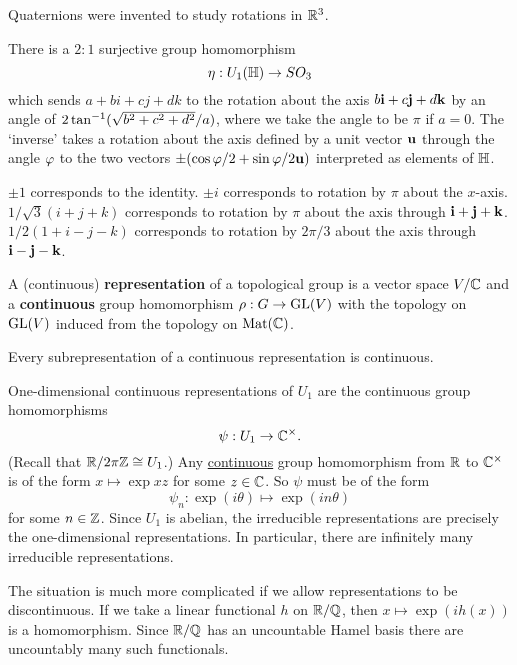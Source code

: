 Quaternions were invented to study rotations in $\mathbb{R}^3$.

\begin{thm}[Hamilton]
  There is a $2:1$ surjective group homomorphism
  \[ \eta: U_1(\mathbb{H}) \to SO_3 \]
  which sends $a+bi+cj+dk$ to the rotation about the axis $b\mathbf{i} + c\mathbf{j} + d\mathbf{k}$ by an angle of $2\tan^{-1}(\sqrt{b^2+c^2+d^2}/a)$, where we take the angle to be $\pi$ if $a=0$.
  The `inverse' takes a rotation about the axis defined by a unit vector $\mathbf{u}$ through the angle $\varphi$ to the two vectors $\pm( \cos\varphi/2 + \sin\varphi/2\mathbf{u})$ interpreted as elements of $\mathbb{H}$.
\end{thm}

\begin{exam}
  \io $\pm 1$ corresponds to the identity.
  \io $\pm i$ corresponds to rotation by $\pi$ about the $x$-axis.
  \io $1/\sqrt{3}(i+j+k)$ corresponds to rotation by $\pi$ about the axis through $\mathbf{i}+\mathbf{j}+\mathbf{k}$.
  \io $1/2(1+i-j-k)$ corresponds to rotation by $2\pi/3$ about the axis through $\mathbf{i}-\mathbf{j}-\mathbf{k}$.
\end{exam}

\begin{defn}
  A (continuous) \textbf{representation} of a topological group is a vector space $V/\mathbb{C}$ and a \textbf{continuous} group homomorphism $\rho: G \to \operatorname{GL}(V)$ with the topology on $\operatorname{GL}(V)$ induced from the topology on $\operatorname{Mat}(\mathbb{C})$.
\end{defn}

\begin{rmk}
  Every subrepresentation of a continuous representation is continuous.
\end{rmk}

\begin{exam}
  One-dimensional continuous representations of $U_1$ are the continuous group homomorphisms
  \[ \psi: U_1 \to \mathbb{C}^\times. \]
  (Recall that $\mathbb{R}/2\pi\mathbb{Z} \cong U_1$.)
  Any \underline{continuous} group homomorphism from $\mathbb{R}$ to $\mathbb{C}^\times$ is of the form $x \mapsto \exp xz$ for some $z \in \mathbb{C}$.
  So $\psi$ must be of the form
  \[ \psi_n: \exp(i\theta) \mapsto \exp(in\theta) \]
  for some $n \in \mathbb{Z}$.
  Since $U_1$ is abelian, the irreducible representations are precisely the one-dimensional representations.
  In particular, there are infinitely many irreducible representations.
\end{exam}

\begin{rmk}
  The situation is much more complicated if we allow representations to be discontinuous.
  If we take a linear functional $h$ on $\mathbb{R}/\mathbb{Q}$, then $x \mapsto \exp(ih(x))$ is a homomorphism.
  Since $\mathbb{R}/\mathbb{Q}$ has an uncountable Hamel basis there are uncountably many such functionals.
\end{rmk}
